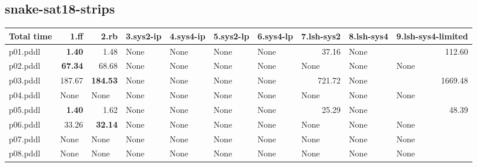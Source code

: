 \documentclass{article}
\begin{document}
\hypertarget{total_time-snake-sat18-strips}{}
\subsection*{snake-sat18-strips}

\begin{tabular}{@{}lrrrrrrrrr@{}}
Total time & 1.ff & 2.rb & 3.sys2-ip & 4.sys4-ip & 5.sys2-lp & 6.sys4-lp & 7.lsh-sys2 & 8.lsh-sys4 & 9.lsh-sys4-limited \\
\midrule
p01.pddl & \textbf{1.40} & 1.48 & \multicolumn{1}{|l|}{None} & \multicolumn{1}{|l|}{None} & \multicolumn{1}{|l|}{None} & \multicolumn{1}{|l|}{None} & 37.16 & \multicolumn{1}{|l|}{None} & 112.60 \\
p02.pddl & \textbf{67.34} & 68.68 & \multicolumn{1}{|l|}{None} & \multicolumn{1}{|l|}{None} & \multicolumn{1}{|l|}{None} & \multicolumn{1}{|l|}{None} & \multicolumn{1}{|l|}{None} & \multicolumn{1}{|l|}{None} & \multicolumn{1}{|l|}{None} \\
p03.pddl & 187.67 & \textbf{184.53} & \multicolumn{1}{|l|}{None} & \multicolumn{1}{|l|}{None} & \multicolumn{1}{|l|}{None} & \multicolumn{1}{|l|}{None} & 721.72 & \multicolumn{1}{|l|}{None} & 1669.48 \\
p04.pddl & \multicolumn{1}{|l|}{None} & \multicolumn{1}{|l|}{None} & \multicolumn{1}{|l|}{None} & \multicolumn{1}{|l|}{None} & \multicolumn{1}{|l|}{None} & \multicolumn{1}{|l|}{None} & \multicolumn{1}{|l|}{None} & \multicolumn{1}{|l|}{None} & \multicolumn{1}{|l|}{None} \\
p05.pddl & \textbf{1.40} & 1.62 & \multicolumn{1}{|l|}{None} & \multicolumn{1}{|l|}{None} & \multicolumn{1}{|l|}{None} & \multicolumn{1}{|l|}{None} & 25.29 & \multicolumn{1}{|l|}{None} & 48.39 \\
p06.pddl & 33.26 & \textbf{32.14} & \multicolumn{1}{|l|}{None} & \multicolumn{1}{|l|}{None} & \multicolumn{1}{|l|}{None} & \multicolumn{1}{|l|}{None} & \multicolumn{1}{|l|}{None} & \multicolumn{1}{|l|}{None} & \multicolumn{1}{|l|}{None} \\
p07.pddl & \multicolumn{1}{|l|}{None} & \multicolumn{1}{|l|}{None} & \multicolumn{1}{|l|}{None} & \multicolumn{1}{|l|}{None} & \multicolumn{1}{|l|}{None} & \multicolumn{1}{|l|}{None} & \multicolumn{1}{|l|}{None} & \multicolumn{1}{|l|}{None} & \multicolumn{1}{|l|}{None} \\
p08.pddl & \multicolumn{1}{|l|}{None} & \multicolumn{1}{|l|}{None} & \multicolumn{1}{|l|}{None} & \multicolumn{1}{|l|}{None} & \multicolumn{1}{|l|}{None} & \multicolumn{1}{|l|}{None} & \multicolumn{1}{|l|}{None} & \multicolumn{1}{|l|}{None} & \multicolumn{1}{|l|}{None} \\

\end{tabular}
\end{document}
